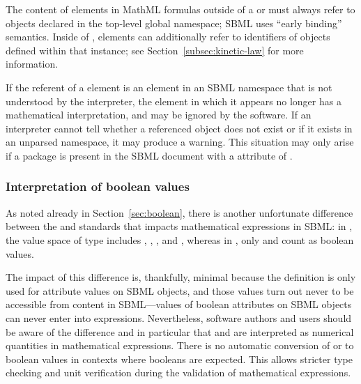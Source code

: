 The content of  elements in MathML formulas outside of a
\KineticLaw or \FunctionDefinition must always refer to objects
declared in the top-level global namespace; \ie SBML uses ``early
binding'' semantics.  Inside of \KineticLaw,  elements
can additionally refer to identifiers of \LocalParameter objects
defined within that \KineticLaw instance; see
Section~\ref{subsec:kinetic-law} for more information.

\begin{blockChanged}
If the referent of a  element is an element in an SBML namespace that is not understood by the interpreter, the  element in which it appears no longer has a mathematical interpretation, and may be ignored by the software.  If an interpreter cannot tell whether a referenced object does not exist or if it exists in an unparsed namespace, it may produce a warning.  This situation may only arise if a package is present in the SBML document with a  attribute of .
\end{blockChanged}

\subsubsection{Interpretation of boolean values}
\label{sec:handling-booleans}

As noted already in Section~\ref{sec:boolean}, there is another
unfortunate difference between the \xmlschemaone and \mathmltwo
standards that impacts mathematical expressions in SBML: in
\xmlschema, the value space of type  includes
, , , and , whereas in
\mathml, only  and  count as boolean
values.

The impact of this difference is, thankfully, minimal because the
\xmlschema definition is only used for attribute values on SBML
objects, and those values turn out never to be accessible from
\mathml content in SBML---values of boolean attributes on SBML objects
can never enter into \mathml expressions.  Nevertheless, software
authors and users should be aware of the difference and in
particular that  and  are interpreted as numerical
quantities in mathematical expressions.  There is no automatic
conversion of  or  to boolean values in contexts
where booleans are expected.  This allows stricter type checking
and unit verification during the validation of mathematical
expressions.



